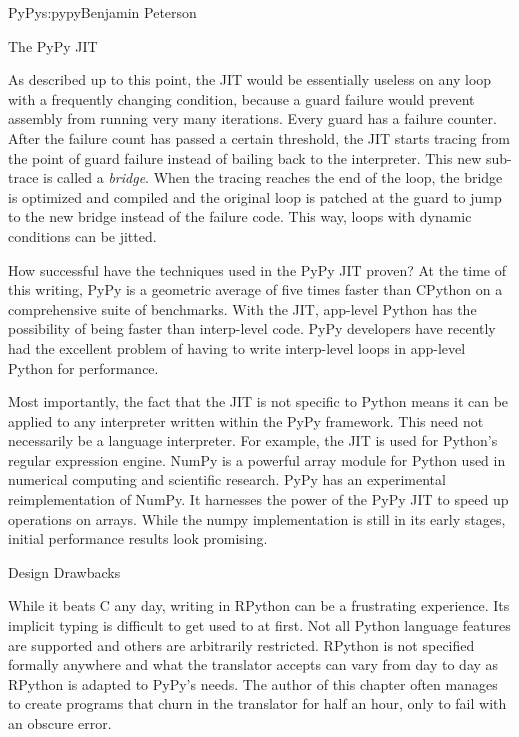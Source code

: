 \begin{aosachapter}{PyPy}{s:pypy}{Benjamin Peterson}
\begin{aosasect1}{The PyPy JIT}

As described up to this point, the JIT would be essentially useless on any loop
with a frequently changing condition, because a guard failure would prevent
assembly from running very many iterations. Every guard has a failure
counter. After the failure count has passed a certain threshold, the JIT starts
tracing from the point of guard failure instead of bailing back to the
interpreter. This new sub-trace is called a \emph{bridge}. When the tracing
reaches the end of the loop, the bridge is optimized and compiled and the
original loop is patched at the guard to jump to the new bridge instead of the
failure code. This way, loops with dynamic conditions can be jitted.

How successful have the techniques used in the PyPy JIT proven? At the time of
this writing, PyPy is a geometric average of five times faster than CPython on a
comprehensive suite of benchmarks. With the JIT, app-level Python has the
possibility of being faster than interp-level code. PyPy developers have
recently had the excellent problem of having to write interp-level loops in
app-level Python for performance.

Most importantly, the fact that the JIT is not specific to Python means it can
be applied to any interpreter written within the PyPy framework. This need not
necessarily be a language interpreter. For example, the JIT is used for Python's
regular expression engine. NumPy is a powerful array module for Python used in
numerical computing and scientific research. PyPy has an experimental
reimplementation of NumPy. It harnesses the power of the PyPy JIT to speed up
operations on arrays. While the numpy implementation is still in its early
stages, initial performance results look promising.

\end{aosasect1}

\begin{aosasect1}{Design Drawbacks}
\label{sec.pypy.drawbacks}

While it beats C any day, writing in RPython can be a frustrating
experience. Its implicit typing is difficult to get used to at first. Not all
Python language features are supported and others are arbitrarily
restricted. RPython is not specified formally anywhere and what the translator
accepts can vary from day to day as RPython is adapted to PyPy's needs. The
author of this chapter often manages to create programs that churn in the
translator for half an hour, only to fail with an obscure error.


\end{aosasect1}
\end{aosachapter}
